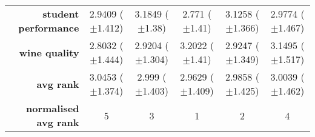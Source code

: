 \begin{table}[htbp]
{\begin{tabular}{r|ccccc}
			\textbf{student performance} & \cellcolor[rgb]{ .89,  .89,  .51}2.9409 ($\pm$1.412)    & \cellcolor[rgb]{ .973,  .412,  .42}3.1849 ($\pm$1.38)   & \cellcolor[rgb]{ .388,  .745,  .482}2.771 ($\pm$1.41)   & \cellcolor[rgb]{ .98,  .561,  .451}3.1258 ($\pm$1.366)  & \cellcolor[rgb]{ 1,  .922,  .518}2.9774 ($\pm$1.467)    \\
			\textbf{wine quality}        & \cellcolor[rgb]{ .388,  .745,  .482}2.8032 ($\pm$1.444) & \cellcolor[rgb]{ .976,  .914,  .514}2.9204 ($\pm$1.304) & \cellcolor[rgb]{ .973,  .412,  .42}3.2022 ($\pm$1.41)   & \cellcolor[rgb]{ 1,  .922,  .518}2.9247 ($\pm$1.349)    & \cellcolor[rgb]{ .98,  .51,  .439}3.1495 ($\pm$1.517)   \\
			\midrule
			\textbf{avg rank}            & \cellcolor[rgb]{ .973,  .412,  .42}3.0453 ($\pm$1.374)  & \cellcolor[rgb]{ 1,  .922,  .518}2.999 ($\pm$1.403)     & \cellcolor[rgb]{ .388,  .745,  .482}2.9629 ($\pm$1.409) & \cellcolor[rgb]{ .773,  .855,  .502}2.9858 ($\pm$1.425) & \cellcolor[rgb]{ 1,  .871,  .51}3.0039 ($\pm$1.462)     \\
			\midrule
			\textbf{normalised avg rank} & \cellcolor[rgb]{ .973,  .412,  .42}5                    & \cellcolor[rgb]{ 1,  .922,  .518}3                      & \cellcolor[rgb]{ .388,  .745,  .482}1                   & \cellcolor[rgb]{ .694,  .831,  .498}2                   & \cellcolor[rgb]{ .988,  .667,  .471}4                   \\
		\end{tabular}%

	}

\end{table}%


